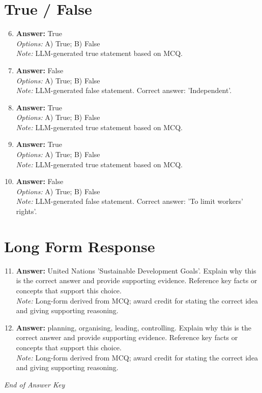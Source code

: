 \documentclass[12pt]{article}
\begin{document}
\section*{True / False}
\begin{enumerate}[label=\arabic*.]
\setcounter{enumi}{5}
\item \textbf{Answer:} True
\\ \textit{Options:} A) True; B) False
\\ \textit{Note:} LLM-generated true statement based on MCQ.
\item \textbf{Answer:} False
\\ \textit{Options:} A) True; B) False
\\ \textit{Note:} LLM-generated false statement. Correct answer: 'Independent'.
\item \textbf{Answer:} True
\\ \textit{Options:} A) True; B) False
\\ \textit{Note:} LLM-generated true statement based on MCQ.
\item \textbf{Answer:} True
\\ \textit{Options:} A) True; B) False
\\ \textit{Note:} LLM-generated true statement based on MCQ.
\item \textbf{Answer:} False
\\ \textit{Options:} A) True; B) False
\\ \textit{Note:} LLM-generated false statement. Correct answer: 'To limit workers' rights'.
\end{enumerate}

\section*{Long Form Response}
\begin{enumerate}[label=\arabic*.]
\setcounter{enumi}{10}
\item \textbf{Answer:} United Nations 'Sustainable Development Goals'. Explain why this is the correct answer and provide supporting evidence. Reference key facts or concepts that support this choice.
\\ \textit{Note:} Long-form derived from MCQ; award credit for stating the correct idea and giving supporting reasoning.
\item \textbf{Answer:} planning, organising, leading, controlling. Explain why this is the correct answer and provide supporting evidence. Reference key facts or concepts that support this choice.
\\ \textit{Note:} Long-form derived from MCQ; award credit for stating the correct idea and giving supporting reasoning.
\end{enumerate}

\vfill
\noindent\textit{End of Answer Key}
\end{document}
